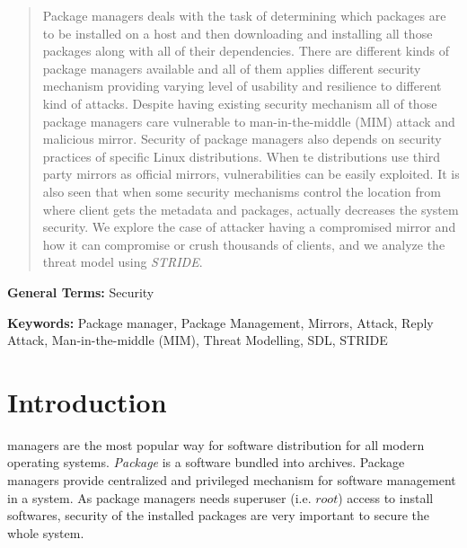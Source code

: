 \documentclass{IEEEtran}
\newcommand{\stride}{\emph{STRIDE}}
\begin{document}
\begin{abstract}
Package managers deals with the task of determining which packages are to be installed on a host and then downloading and installing all those packages along with all of their dependencies. There are different kinds of package managers available and all of them applies different security mechanism providing varying level of usability and resilience to different kind of attacks. Despite having existing security mechanism all of those package managers care vulnerable to man-in-the-middle (MIM) attack and malicious mirror. Security of package managers also depends on security practices of specific Linux distributions. When te distributions use third party mirrors as official mirrors, vulnerabilities can be easily exploited. It is also seen that when some security mechanisms control the location from where client gets the metadata and packages, actually decreases the system security. We explore the case of attacker having a compromised mirror and how it can compromise or crush thousands of clients, and we analyze the threat model using \stride .
\end{abstract}

{\bf General Terms:} Security

{\bf Keywords:} Package manager, Package Management, Mirrors, Attack, Reply Attack, Man-in-the-middle (MIM), Threat Modelling, SDL, STRIDE


\IEEEpeerreviewmaketitle

\section{Introduction}
\label{sec:introduction}
 managers are the most popular way for software distribution for all modern operating systems. \emph{Package} is a software bundled into archives. Package managers provide centralized and privileged mechanism for software management in a system. As package managers needs superuser (i.e. $root$) access to install softwares, security of the installed packages are very important to secure the whole system.
\end{document}
